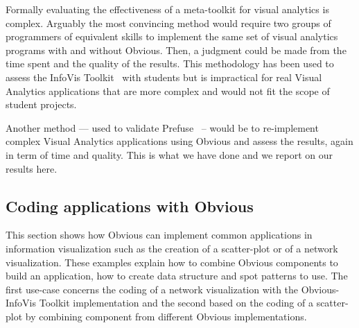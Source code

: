 Formally evaluating the effectiveness of a meta-toolkit for visual
analytics is complex. Arguably the most convincing method would
require two groups of programmers of equivalent skills to implement
the same set of visual analytics programs with and without
Obvious. Then, a judgment could be made from the time spent and the
quality of the results. This methodology has been used to assess the
InfoVis Toolkit~\cite{InfoVis} with students but is impractical for
real Visual Analytics applications that are more complex and would not
fit the scope of student projects.

Another method --- used to validate Prefuse~\cite{Prefuse} -- would be
to re-implement complex Visual Analytics applications using Obvious
and assess the results, again in term of time and quality. This is
what we have done and we report on our results here.

\subsection{Coding applications with Obvious}

This section shows how Obvious can implement common applications in
information visualization such as the creation of a scatter-plot or of
a network visualization.  These examples explain how to combine
Obvious components to build an application, how to create data
structure and spot patterns to use.  The first use-case concerns the
coding of a network visualization with the Obvious-InfoVis Toolkit
implementation and the second based on the coding of a scatter-plot by
combining component from different Obvious implementations.

